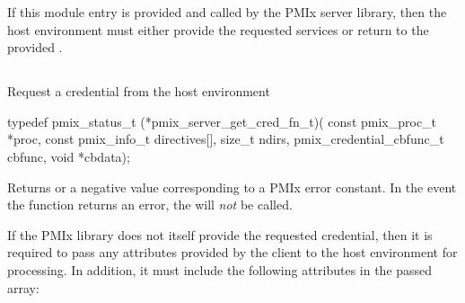 \advicermstart
If this module entry is provided and called by the \ac{PMIx} server library, then the host environment must either provide the requested services or return  to the provided .
\advicermend

\subsection{}

\summary

Request a credential from the host environment

\format

\cspecificstart
\begin{codepar}
typedef pmix_status_t (*pmix_server_get_cred_fn_t)(
                             const pmix_proc_t *proc,
                             const pmix_info_t directives[],
                             size_t ndirs,
                             pmix_credential_cbfunc_t cbfunc,
                             void *cbdata);
\end{codepar}
\cspecificend

\begin{arglist}
\end{arglist}

Returns  or a negative value corresponding to a PMIx error constant. In the event the function returns an error, the  will \textit{not} be called.

\reqattrstart
If the \ac{PMIx} library does not itself provide the requested credential, then it is required to pass any attributes provided by the client to the host environment for processing. In addition, it must include the following attributes in the passed  array:


